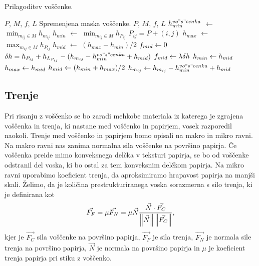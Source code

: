 %
\begin{algorithm}[htb]
  \caption{Prilagoditev voščenke.}
  \label{alg:adjustCrayonHeight}
\begin{algorithmic}[1]
\Require $P$, $M$, $f$, $L$
\Ensure Spremenjena maska voščenke.
 {$P$, $M$, $f$, $L$}
  \State $h_{min}^{vo"s"cenka}$ $\gets$ $\displaystyle \min_{m_{ij} \in M} h_{m_{ij}}$
  \State $h_{min}$ $\gets$ $\displaystyle \min_{m_{ij} \in M} h_{P_{ij}}$ \Comment $P_{ij} = P + (i, j)$
  \State $h_{max}$ $\gets$ $\displaystyle \max_{m_{ij} \in M} h_{P_{ij}}$
    \State $h_{mid}$ $\gets$ $(h_{max} - h_{min})/2$
    \State $f_{mid} \gets 0$
      \State $\delta h = h_{P_{ij}} + h_{L_{P_{ij}}} - (h_{m_{ij}} - h_{min}^{vo"s"cenka} + h_{mid})$
        \State $f_{mid} \gets \lambda \delta h$
      \EndIf
        \State $h_{min} \gets h_{mid}$
      \Else
        \State $h_{max} \gets h_{mid}$
      \EndIf
    \EndFor
    \State $h_{mid} \gets (h_{min} + h_{max})/2$
      \State $h_{m_{ij}} \gets h_{m_{ij}} - h_{min}^{vo"s"cenka} + h_{mid}$
    \EndFor
  \EndWhile
\EndFunction
\end{algorithmic}
\end{algorithm}
%

\subsection{Trenje}
Pri risanju z voščenko se bo zaradi mehkobe materiala iz katerega je zgrajena voščenka in trenja, ki nastane med voščenko in papirjem, vosek razporedil naokoli. %
Trenje med voščenko in papirjem bomo opisali na makro in mikro ravni. Na makro ravni nas zanima normalna sila voščenke na površino papirja. Če voščenka preide mimo konveksnega %
delčka v teksturi papirja, se bo od voščenke odstranil del voska, ki bo ostal za tem konveksnim delčkom papirja. Na mikro ravni uporabimo koeficient trenja, da aproksimiramo hrapavost papirja na manjši skali. Želimo, da je količina prestrukturiranega voska sorazmerna s silo trenja, ki je definirana kot
$$
\vec{F_F} = \mu \vec{F_N} = \mu \vec{N} \frac{\vec{N} \cdot \vec{F_C}}{\norm{\vec{N}} \norm{\vec{F_C}}}, %
$$
kjer je $\vec{F_C}$ sila voščenke na površino papirja, $\vec{F_F}$ je sila trenja, $\vec{F_N}$ je normala sile trenja na površino papirja, $\vec{N}$ je normala na površino papirja in $\mu$ je koeficient trenja papirja pri stiku z voščenko. %

